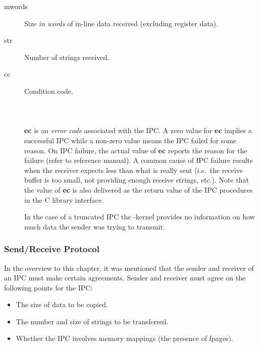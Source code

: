 \begin{description}

\item[mwords] Size \emph{in words} of in-line data received (excluding
  register data).

\item[str] Number of strings received.

\item[cc] Condition code. \\ \\ 
  \\ \\ \textbf{ec} is an \emph{error code} associated with the IPC. A
  zero value for \textbf{ec} implies a successful IPC while a non-zero
  value means the IPC failed for some reason. On IPC failure, the
  actual value of \textbf{ec} reports the reason for the failure
  (refer to reference manual). A common cause of IPC failure results
  when the receiver expects less than what is really sent (i.e.\ the
  receive buffer is too small, not providing enough receive strings,
  etc.). Note that the value of \textbf{ec} is also delivered as the
  return value of the IPC procedures in the C library interface.

  In the case of a truncated IPC the \micro-kernel provides no
  information on how much data the sender was trying to transmit.

\end{description}


\subsubsection{Send/Receive Protocol}


In the overview to this chapter, it was mentioned that the sender and
receiver of an IPC must make certain agreements. Sender and receiver
must agree on the following points for the IPC:

\begin{itemize}

\item The size of data to be copied.

\item The number and size of strings to be transferred.

\item Whether the IPC involves memory mappings (the presence of
  fpages).

\end{itemize}

